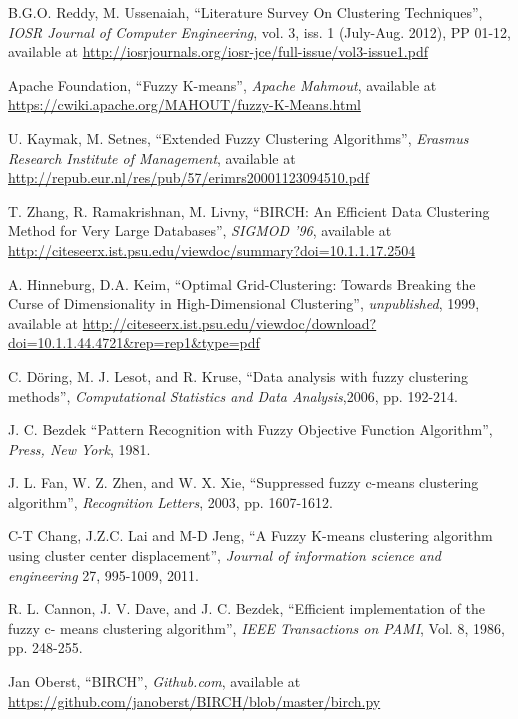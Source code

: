 \documentclass[conference, 10pt]{IEEEtran}
\begin{document}
\begin{thebibliography}{1}
 B.G.O. Reddy, M. Ussenaiah, ``Literature Survey On Clustering Techniques'', \emph{IOSR Journal of Computer Engineering}, vol. 3, iss. 1 (July-Aug. 2012), PP 01-12, available at
\url{http://iosrjournals.org/iosr-jce/full-issue/vol3-issue1.pdf}

 Apache Foundation, ``Fuzzy K-means'', \emph{Apache Mahmout}, available at
\url{https://cwiki.apache.org/MAHOUT/fuzzy-K-Means.html}

 U. Kaymak, M. Setnes, ``Extended Fuzzy Clustering Algorithms'', \emph{Erasmus Research Institute of Management}, available at
\url{http://repub.eur.nl/res/pub/57/erimrs20001123094510.pdf}

 T. Zhang, R. Ramakrishnan, M. Livny, ``BIRCH: An Efficient Data Clustering Method for Very Large Databases'', \emph{SIGMOD ’96}, available at
\url{http://citeseerx.ist.psu.edu/viewdoc/summary?doi=10.1.1.17.2504}

 A. Hinneburg, D.A. Keim, ``Optimal Grid-Clustering: Towards Breaking the Curse of Dimensionality in High-Dimensional Clustering'', \emph{unpublished}, 1999, available at
\url{http://citeseerx.ist.psu.edu/viewdoc/download?doi=10.1.1.44.4721&rep=rep1&type=pdf}  

                                             
 C. Döring, M. J. Lesot, and R. Kruse, ``Data analysis with fuzzy clustering methods'', \emph{Computational Statistics and Data Analysis},2006, pp. 192-214.

 J. C. Bezdek ``Pattern Recognition with Fuzzy Objective Function Algorithm'', \emph{Press, New York}, 1981.

 J. L. Fan, W. Z. Zhen, and W. X. Xie, ``Suppressed fuzzy c-means clustering algorithm'', \emph{ Recognition Letters}, 2003, pp. 1607-1612.

 C-T Chang, J.Z.C. Lai and M-D Jeng, ``A Fuzzy K-means clustering algorithm  using cluster center displacement'', \emph{Journal of information science and engineering} 27, 995-1009, 2011.

 R. L. Cannon, J. V. Dave, and J. C. Bezdek, ``Efficient implementation of the fuzzy c- means clustering algorithm'', \emph{IEEE Transactions on PAMI}, Vol. 8, 1986, pp. 248-255.

 Jan Oberst, ``BIRCH'', \emph{Github.com}, available at
\url{https://github.com/janoberst/BIRCH/blob/master/birch.py}

\end{thebibliography}

\end{document}
